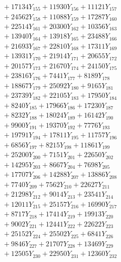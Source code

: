 \documentclass[a4paper,10pt]{article}
\begin{document}
{\begin{align}
&\;  + 17134 Y_{155} + 11930 Y_{156} + 11121 Y_{157} \\[0.3ex]
&\;  + 24562 Y_{158} + 11088 Y_{159} + 17287 Y_{160} \\[0.3ex]
&\;  + 22514 Y_{161} + 20300 Y_{162} + 10356 Y_{163} \\[0.3ex]
&\;  + 13940 Y_{164} + 13918 Y_{165} + 23488 Y_{166} \\[0.3ex]
&\;  + 21693 Y_{167} + 22810 Y_{168} + 17311 Y_{169} \\[0.3ex]
&\;  + 13931 Y_{170} + 21914 Y_{171} + 20655 Y_{172} \\[0.3ex]
&\;  + 20157 Y_{173} + 21670 Y_{174} + 24150 Y_{175} \\[0.3ex]
&\;  + 23816 Y_{176} + 7441 Y_{177} + 8189 Y_{178} \\[0.5ex]\allowbreak
&\;  + 18867 Y_{179} + 25092 Y_{180} + 9165 Y_{181} \\[0.3ex]
&\;  + 23739 Y_{182} + 22105 Y_{183} + 17950 Y_{184} \\[0.3ex]
&\;  + 8240 Y_{185} + 17966 Y_{186} + 17230 Y_{187} \\[0.3ex]
&\;  + 8232 Y_{188} + 18024 Y_{189} + 16142 Y_{190} \\[0.3ex]
&\;  + 9900 Y_{191} + 19370 Y_{192} + 7776 Y_{193} \\[0.3ex]
&\;  + 19791 Y_{194} + 17811 Y_{195} + 11757 Y_{196} \\[0.3ex]
&\;  + 6856 Y_{197} + 8215 Y_{198} + 11861 Y_{199} \\[0.3ex]
&\;  + 25200 Y_{200} + 7151 Y_{201} + 22650 Y_{202} \\[0.3ex]
&\;  + 14295 Y_{203} + 8667 Y_{204} + 7698 Y_{205} \\[0.3ex]
&\;  + 17707 Y_{206} + 14288 Y_{207} + 13886 Y_{208} \\[0.5ex]\allowbreak
&\;  + 7740 Y_{209} + 7562 Y_{210} + 22627 Y_{211} \\[0.3ex]
&\;  + 21298 Y_{212} + 9014 Y_{213} + 23541 Y_{214} \\[0.3ex]
&\;  + 12011 Y_{215} + 25157 Y_{216} + 16990 Y_{217} \\[0.3ex]
&\;  + 8717 Y_{218} + 17414 Y_{219} + 19913 Y_{220} \\[0.3ex]
&\;  + 9002 Y_{221} + 12441 Y_{222} + 22622 Y_{223} \\[0.3ex]
&\;  + 25152 Y_{224} + 25502 Y_{225} + 6841 Y_{226} \\[0.3ex]
&\;  + 9846 Y_{227} + 21707 Y_{228} + 13469 Y_{229} \\[0.3ex]
&\;  + 12505 Y_{230} + 22950 Y_{231} + 12360 Y_{232} \\[0.3ex]

\end{align}}
\end{document}
